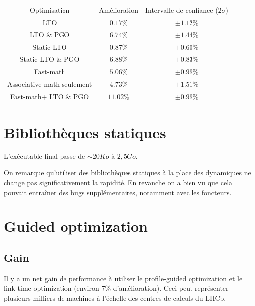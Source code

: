 \documentclass[a4paper]{report}
\begin{document}
\begin{center}
    \begin{tabular}{ c c c }
        Optimisation                           & Amélioration & Intervalle de confiance ($2\sigma$) \\
        LTO                                    & $0.17\%$     & $\pm 1.12\%$                        \\
        LTO \& PGO                             & $6.74\%$     & $\pm 1.44\%$                        \\
        Static LTO                             & $0.87\%$     & $\pm 0.60\%$                        \\
        Static LTO \& PGO                      & $6.88\%$     & $\pm 0.83\%$                        \\
        Fast-math\footnotemark[1]              & $5.06\%$     & $\pm 0.98\%$                        \\
        Associative-math seulement             & $4.73\%$     & $\pm 1.51\%$                        \\
        Fast-math\footnotemark[1] + LTO \& PGO & $11.02\%$    & $\pm 0.98\%$
    \end{tabular}

\end{center}

\section{Bibliothèques statiques}
L'exécutable final passe de $\sim 20 Ko$ à $2,5 Go$.

On remarque qu'utiliser des bibliothèques statiques à la place des dynamiques ne change pas significativement la rapidité.
En revanche on a bien vu que cela pouvait entraîner des bugs supplémentaires, notamment avec les foncteurs.

\section{Guided optimization}
\subsection{Gain}
Il y a un net gain de performance à utiliser le profile-guided optimization et le link-time optimization (environ $7\%$ d'amélioration).
Ceci peut représenter plusieurs milliers de machines à l'échelle des centres de calculs du LHCb.
\end{document}
